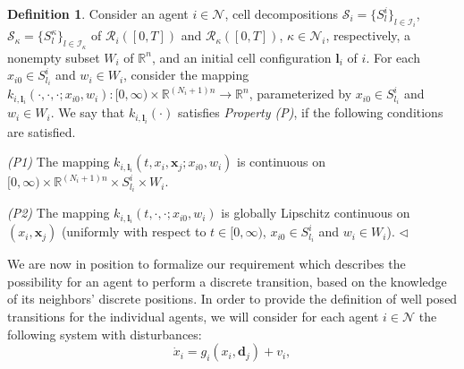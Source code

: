 \documentclass[reqno]{amsart}
\theoremstyle{plain}
\theoremstyle{definition}
\newtheorem{dfn}[thm]{Definition}
\numberwithin{equation}{section}
\begin{document}
\begin{dfn}\label{control:class}
\noindent Consider an agent $i\in{\ensuremath{\mathcal{N}}}$, cell decompositions ${\ensuremath{\mathcal{S}}}_i=\{S_l^i\}_{l\in{\ensuremath{\mathcal{I}}}_i}$, ${\ensuremath{\mathcal{S}}}_{\kappa}=\{S_l^{\kappa}\}_{l\in{\ensuremath{\mathcal{I}}}_{\kappa}}$ of ${\ensuremath{\mathcal{R}}}_i([0,T])$ and ${\ensuremath{\mathcal{R}}}_{\kappa}([0,T])$, $\kappa\in{\ensuremath{\mathcal{N}}}_i$, respectively, a nonempty subset $W_i$ of ${\ensuremath{\mathbb{R}^{{n}}}}$, and an initial cell configuration ${\textbf{{l}}}_i$ of $i$. For each $x_{i0}\in S_{l_i}^i$ and $w_i\in W_i$, consider the mapping  $k_{i,{\textbf{{l}}}_i}(\cdot,\cdot,\cdot;x_{i0},w_i):[0,\infty)\times {\ensuremath{\mathbb{R}^{{(N_i+1)n}}}}\to{\ensuremath{\mathbb{R}^{{n}}}}$, parameterized by $x_{i0}\in S_{l_i}^i$ and $w_i\in W_i$. We say that $k_{i,{\textbf{{l}}}_i}(\cdot)$ satisfies \textit{Property (P)}, if the following conditions are satisfied.

\noindent\textit{(P1)} The mapping $k_{i,{\textbf{{l}}}_i}(t,x_i,{\textbf{{x}}}_j;x_{i0},w_i)$ is continuous on $[0,\infty)\times {\ensuremath{\mathbb{R}^{{(N_i+1)n}}}}\times S_{l_i}^i\times W_i$.

\noindent\textit{(P2)} The mapping $k_{i,{\textbf{{l}}}_i}(t,\cdot,\cdot;x_{i0},w_i)$ is globally Lipschitz 
continuous on $(x_i,{\textbf{{x}}}_j)$ (uniformly with respect to $t\in[0,\infty)$, $x_{i0}\in S_{l_i}^i$ and $w_i\in W_i$). $\triangleleft$
\end{dfn}

\noindent We are now in position to formalize our requirement which describes the possibility for an agent to perform a discrete transition, based on the knowledge of its neighbors' discrete positions. In order to provide the definition of well posed transitions for the individual agents, we will consider for each agent $i\in{\ensuremath{\mathcal{N}}}$ the following system with disturbances:
\begin{equation} \label{system:disturbances}
\dot{x}_i=g_i(x_i,{\textbf{{d}}}_j)+v_i,
\end{equation}
\end{document}
